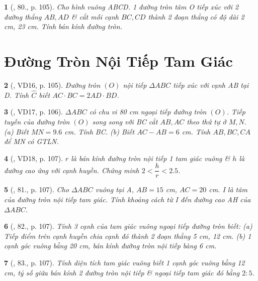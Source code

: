\documentclass{article}
\newtheorem{baitoan}{}
\begin{document}
\begin{baitoan}[\cite{Binh_Toan_9_tap_1}, 80., p. 105]
	Cho hình vuông ABCD. 1 đường tròn tâm O tiếp xúc với 2 đường thẳng $AB,AD$ \& cắt mỗi cạnh $BC,CD$ thành 2 đoạn thẳng có độ dài {\rm2 cm, 23 cm}. Tính bán kính đường tròn.
\end{baitoan}


\section{Đường Tròn Nội Tiếp Tam Giác}

\begin{baitoan}[\cite{Binh_Toan_9_tap_1}, VD16, p. 105]
	Đường tròn $(O)$ nội tiếp $\Delta ABC$ tiếp xúc với cạnh AB tại D. Tính $\widehat{C}$ biết $AC\cdot BC = 2AD\cdot BD$.
\end{baitoan}

\begin{baitoan}[\cite{Binh_Toan_9_tap_1}, VD17, p. 106]
	$\Delta ABC$ có chu vi {\rm80 cm} ngoại tiếp đường tròn $(O)$. Tiếp tuyến của đường tròn $(O)$ song song với BC cắt $AB,AC$ theo thứ tự ở $M,N$. (a) Biết $MN = 9.6$ {\rm cm}. Tính BC. (b) Biết $AC - AB = 6$ {\rm cm}. Tính $AB,BC,CA$ để MN có {\rm GTLN}.
\end{baitoan}

\begin{baitoan}[\cite{Binh_Toan_9_tap_1}, VD18, p. 107]
	$r$ là bán kính đường tròn nội tiếp 1 tam giác vuông \& $h$ là đường cao ứng với cạnh huyền. Chứng minh $2 < \dfrac{h}{r} < 2.5$.
\end{baitoan}

\begin{baitoan}[\cite{Binh_Toan_9_tap_1}, 81., p. 107]
	Cho $\Delta ABC$ vuông tại A, $AB = 15$ {\rm cm}, $AC = 20$ {\rm cm}. I là tâm của đường tròn nội tiếp tam giác. Tính khoảng cách từ I đến đường cao AH của $\Delta ABC$. 
\end{baitoan}

\begin{baitoan}[\cite{Binh_Toan_9_tap_1}, 82., p. 107]
	Tính 3 cạnh của tam giác vuông ngoại tiếp đường tròn biết: (a) Tiếp điểm trên cạnh huyền chia cạnh đó thành 2 đoạn thẳng {\rm5 cm, 12 cm}. (b) 1 cạnh góc vuông bằng {\rm20 cm}, bán kính đường tròn nội tiếp bàng {\rm6 cm}.
\end{baitoan}

\begin{baitoan}[\cite{Binh_Toan_9_tap_1}, 83., p. 107]
	Tính diện tích tam giác vuông biết 1 cạnh góc vuông bằng {\rm12 cm}, tỷ số giữa bán kính 2 đường tròn nội tiếp \& ngoại tiếp tam giác đó bằng $2:5$.
\end{baitoan}
\end{document}

